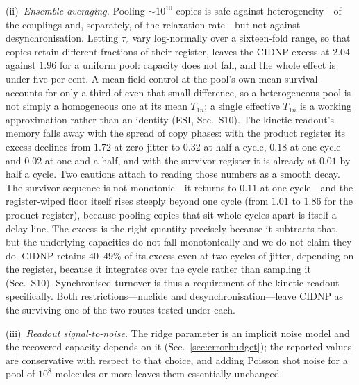 \documentclass[aps,prx,reprint,superscriptaddress,nofootinbib,floatfix]{revtex4-2}
\begin{document}
(ii)~\emph{Ensemble averaging.} Pooling $\sim10^{10}$ copies is safe against
heterogeneity---of the couplings and, separately, of the relaxation rate---but not
against desynchronisation. Letting $\tau_c$ vary log-normally over a sixteen-fold
range, so that copies retain different fractions of their register, leaves the
CIDNP excess at $2.04$ against $1.96$ for a uniform pool: capacity does not fall,
and the whole effect is under five per cent. A mean-field control at the pool's
own mean survival accounts for only a third of even that small difference, so a
heterogeneous pool is not simply a homogeneous one at its mean $T_{1n}$; a single
effective $T_{1n}$ is a working approximation rather than an identity
(ESI, Sec.~S10). The kinetic readout's memory falls away
with the spread of copy phases: with the product register its excess declines
from $1.72$ at zero jitter to $0.32$ at half a cycle, $0.18$ at one cycle and
$0.02$ at one and a half, and with the survivor register it is already at $0.01$
by half a cycle. Two cautions attach to reading those numbers as a smooth decay.
The survivor sequence is not monotonic---it returns to $0.11$ at one cycle---and
the register-wiped floor itself rises steeply beyond one cycle (from $1.01$ to
$1.86$ for the product register), because pooling copies that sit whole cycles
apart is itself a delay line. The excess is the right quantity precisely because
it subtracts that, but the underlying capacities do not fall monotonically and we
do not claim they do. CIDNP retains $40$--$49\%$ of its excess even at two cycles
of jitter, depending on the register, because it integrates over the cycle rather than sampling it
(Sec.~S10). Synchronised turnover is thus a requirement of the kinetic readout
specifically. Both restrictions---nuclide and desynchronisation---leave CIDNP as the surviving
one of the two routes tested under each.

(iii)~\emph{Readout signal-to-noise.} The ridge parameter is an implicit noise
model and the recovered capacity depends on it (Sec.~\ref{sec:errorbudget}); the
reported values are conservative with respect to that choice, and adding Poisson
shot noise for a pool of $10^{8}$ molecules or more leaves them essentially
unchanged.
\end{document}
